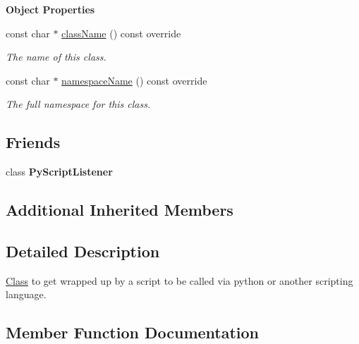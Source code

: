 \begin{Indent}\textbf{ Object Properties}\par
\begin{DoxyCompactItemize}
\item 
const char $\ast$ \mbox{\hyperlink{classrev_1_1_script_listener_aa9e78ea774509b6f67a4df258645c7bb}{class\+Name}} () const override
\begin{DoxyCompactList}\small\item\em The name of this class. \end{DoxyCompactList}\item 
const char $\ast$ \mbox{\hyperlink{classrev_1_1_script_listener_aec59340a0007e966eb08f9fb28c0bdac}{namespace\+Name}} () const override
\begin{DoxyCompactList}\small\item\em The full namespace for this class. \end{DoxyCompactList}\end{DoxyCompactItemize}
\end{Indent}
\subsection*{Friends}
\begin{DoxyCompactItemize}
\item 
\mbox{\label{classrev_1_1_script_listener_a11cabc4a3f92e9c0c57fcbdfb58ca792}} 
class {\bfseries Py\+Script\+Listener}
\end{DoxyCompactItemize}
\subsection*{Additional Inherited Members}


\subsection{Detailed Description}
\mbox{\hyperlink{struct_class}{Class}} to get wrapped up by a script to be called via python or another scripting language. 

\subsection{Member Function Documentation}
\mbox{\label{classrev_1_1_script_listener_aa9e78ea774509b6f67a4df258645c7bb}} 

